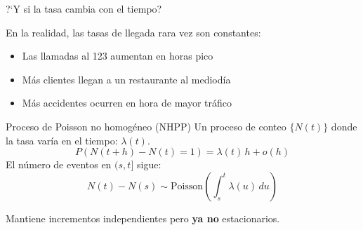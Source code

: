 \documentclass[aspectratio=1610, 9pt]{beamer}
\begin{document}
\begin{frame}{?`Y si la tasa cambia con el tiempo?}

En la realidad, las tasas de llegada rara vez son constantes:

\begin{itemize}
    \item Las llamadas al 123 aumentan en horas pico
    \item M\'{a}s clientes llegan a un restaurante al mediod\'{i}a
    \item M\'{a}s accidentes ocurren en hora de mayor tr\'{a}fico
\end{itemize}

\vspace{0.3cm}
\begin{block}{Proceso de Poisson no homog\'{e}neo (NHPP)}
Un proceso de conteo $\{N(t)\}$ donde la tasa var\'{i}a en el tiempo: $\lambda(t)$.
\[
P(N(t+h) - N(t) = 1) = \lambda(t)\,h + o(h)
\]
El n\'{u}mero de eventos en $(s,t]$ sigue:
\[
N(t) - N(s) \sim \text{Poisson}\!\left(\int_s^t \lambda(u)\,du\right)
\]
\end{block}

Mantiene incrementos independientes pero \textbf{ya no} estacionarios.
\end{frame}
\end{document}
